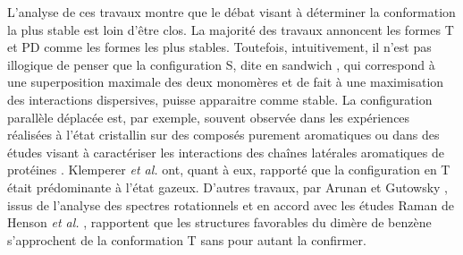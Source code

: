 	L’analyse de ces travaux montre que le débat visant à déterminer la conformation la plus stable est loin d’être clos. La majorité des travaux annoncent les formes T et PD comme les formes les plus stables. Toutefois, intuitivement, il n'est pas illogique de penser que la configuration S, dite \og en sandwich \fg, qui correspond à une superposition maximale des deux monomères et de fait à une maximisation des interactions dispersives, puisse apparaitre comme stable. La configuration parallèle déplacée est, par exemple, souvent observée dans les expériences réalisées à l’état cristallin sur des composés purement aromatiques \cite{hunter1991pi,fyfe1997synthetic,rebek1996assembly} ou dans des études visant à caractériser les interactions des chaînes latérales aromatiques de protéines \cite{hunter1991pi,burley1985aromatic}. Klemperer \textit{et al.} \cite{janda1975benzene} ont, quant à eux, rapporté que la configuration en T était prédominante à l’état gazeux. D’autres travaux, par Arunan et Gutowsky \cite{arunan1993rotational}, issus de l'analyse des spectres rotationnels et en accord avec les études Raman de Henson \textit{et al.} \cite{henson1992raman}, rapportent que les structures favorables du dimère de benzène s’approchent de la conformation T sans pour autant la confirmer.\\ 
	
